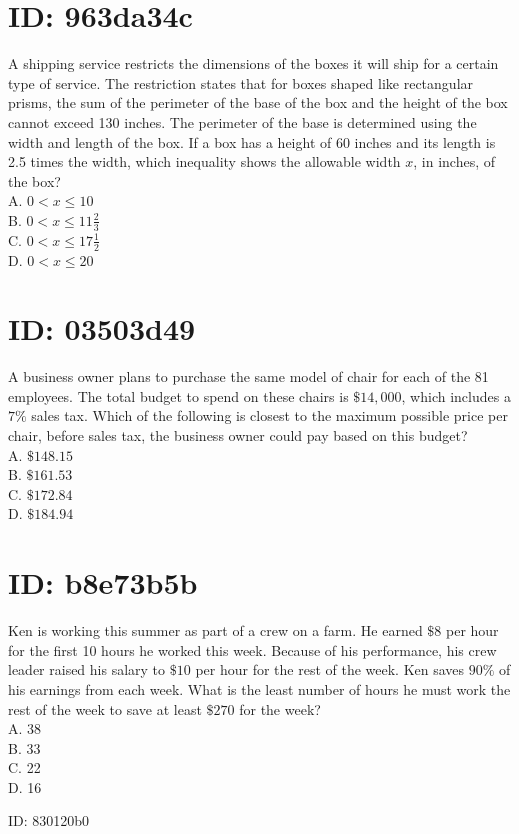 \section*{ID: 963da34c}
A shipping service restricts the dimensions of the boxes it will ship for a certain type of service. The restriction states that for boxes shaped like rectangular prisms, the sum of the perimeter of the base of the box and the height of the box cannot exceed 130 inches. The perimeter of the base is determined using the width and length of the box. If a box has a height of 60 inches and its length is 2.5 times the width, which inequality shows the allowable width $x$, in inches, of the box?\\
A. $0<x \leq 10$\\
B. $0<x \leq 11 \frac{2}{3}$\\
C. $0<x \leq 17 \frac{1}{2}$\\
D. $0<x \leq 20$

\section*{ID: 03503d49}
A business owner plans to purchase the same model of chair for each of the 81 employees. The total budget to spend on these chairs is $\$ 14,000$, which includes a $7 \%$ sales tax. Which of the following is closest to the maximum possible price per chair, before sales tax, the business owner could pay based on this budget?\\
A. $\$ 148.15$\\
B. $\$ 161.53$\\
C. $\$ 172.84$\\
D. $\$ 184.94$

\section*{ID: b8e73b5b}
Ken is working this summer as part of a crew on a farm. He earned $\$ 8$ per hour for the first 10 hours he worked this week. Because of his performance, his crew leader raised his salary to $\$ 10$ per hour for the rest of the week. Ken saves $90 \%$ of his earnings from each week. What is the least number of hours he must work the rest of the week to save at least $\$ 270$ for the week?\\
A. 38\\
B. 33\\
C. 22\\
D. 16

ID: 830120b0

